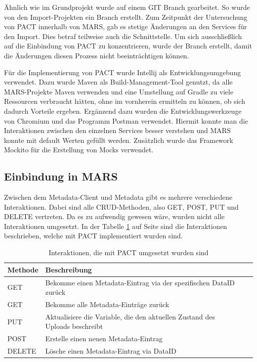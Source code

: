 \documentclass{llncs}
\begin{document}
Ähnlich wie im Grundprojekt wurde auf einem GIT Branch gearbeitet. So wurde von den Import-Projekten ein Branch erstellt. Zum Zeitpunkt der Untersuchung von PACT innerhalb von MARS, gab es stetige Änderungen an den Services für den Import. Dies betraf teilweise auch die Schnittstelle. Um sich ausschließlich auf die Einbindung von PACT zu konzentrieren, wurde der Branch erstellt, damit die Änderungen diesen Prozess nicht beeinträchtigen können.

Für die Implementierung von PACT wurde Intellij als Entwicklungsumgebung verwendet. Dazu wurde Maven als Build-Management-Tool genutzt, da alle MARS-Projekte Maven verwenden und eine Umstellung auf Gradle zu viele Ressourcen verbraucht hätten, ohne im vornherein ermitteln zu können, ob sich dadurch Vorteile ergeben. Ergänzend dazu wurden die Entwicklungswerkzeuge von Chromium und das Programm Postman verwendet. Hiermit konnte man die Interaktionen zwischen den einzelnen Services besser verstehen und MARS konnte mit default Werten gefüllt werden. Zusätzlich wurde das Framework Mockito für die Erstellung von Mocks verwendet.

\subsection{Einbindung in MARS}
Zwischen dem Metadata-Client und Metadata gibt es mehrere verschiedene Interaktionen. Dabei sind alle CRUD-Methoden, also GET, POST, PUT und DELETE vertreten. Da es zu aufwendig gewesen wäre, wurden nicht alle Interaktionen umgesetzt. In der Tabelle \ref{tab:Interaktionen_PACT} auf Seite \pageref{tab:Interaktionen_PACT} sind die Interaktionen beschrieben, welche mit PACT implementiert wurden sind.

\begin{table}[htbp]
\centering
\begin{tabular}{|l|l|p{4cm}|p{4cm}|}
\hline
\multicolumn{1}{|l|}{Methode} & Beschreibung \\ \hline
GET & Bekomme einen Metadata-Eintrag via der spezifischen DataID zurück\\ \hline
GET & Bekomme alle Metadata-Einträge zurück \\ \hline
PUT & Aktualisiere die Variable, die den aktuellen Zustand des Uploads beschreibt \\ \hline
POST & Erstelle einen neuen Metadata-Eintrag \\ \hline
DELETE & Lösche einen Metadata-Eintrag via DataID\\ \hline
\end{tabular}
\caption{Interaktionen, die mit PACT umgesetzt wurden sind}
\label{tab:Interaktionen_PACT}
\end{table}
\end{document}
